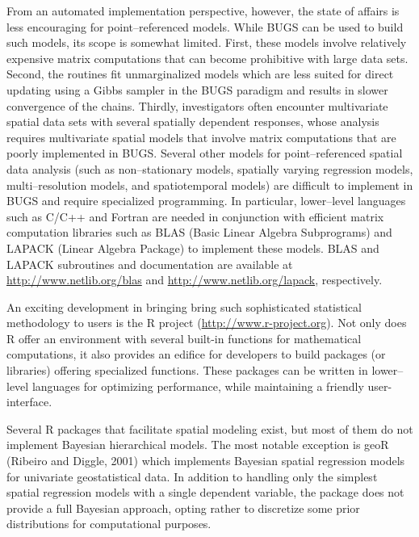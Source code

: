 \documentclass[a4paper]{article}
\let\proglang=\textsf
\newcommand{\pkg}[1]{{\normalfont\fontseries{b}\selectfont #1}}
\begin{document}
From an automated implementation perspective, however, the state of
affairs is less encouraging for point--referenced models. While \pkg{BUGS} can be used to build such models,
its scope is somewhat limited. First, these models involve
relatively expensive matrix computations that can become prohibitive
with large data sets. Second, the routines fit unmarginalized models which are less suited for
direct updating using a Gibbs sampler in the \pkg{BUGS} paradigm
and results in slower convergence of the chains. Thirdly,
investigators often encounter multivariate spatial data sets with
several spatially dependent responses, whose analysis requires
multivariate spatial models that involve matrix computations that
are poorly implemented in \pkg{BUGS}. Several other models for
point--referenced spatial data analysis (such as non--stationary
models, spatially varying regression models, multi--resolution
models, and spatiotemporal models) are difficult to implement in
\pkg{BUGS} and require specialized programming.
In particular, lower--level languages such as
\proglang{C}/\proglang{C++} and \proglang{Fortran} are needed in conjunction with efficient matrix computation libraries such as 
\pkg{BLAS} (Basic Linear Algebra Subprograms) and \pkg{LAPACK} (Linear Algebra Package) to implement these models.  \pkg{BLAS} and \pkg{LAPACK} subroutines and documentation are available at \url{http://www.netlib.org/blas} and \url{http://www.netlib.org/lapack}, respectively.

An exciting development in bringing bring such
sophisticated statistical methodology to users is the
\proglang{R} project (\url{http://www.r-project.org}). Not only does
\proglang{R} offer an environment with several built-in functions for
mathematical computations, it also provides an edifice for developers to
build packages (or libraries) offering specialized
functions. These packages can be written in lower--level
languages for optimizing performance, while maintaining a friendly user-interface.

Several \proglang{R} packages that facilitate spatial modeling
exist, but most of them do not implement Bayesian hierarchical
models. The most notable exception is \pkg{geoR} (Ribeiro and Diggle, 2001)
which implements Bayesian spatial regression models for univariate
geostatistical data. In addition to  handling only the simplest
spatial regression models with a single dependent variable, the
package does not provide a full Bayesian approach, opting rather to discretize some prior distributions for computational purposes. 
\end{document}
